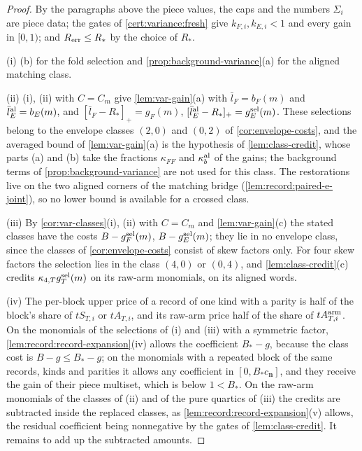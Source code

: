 \begin{proof}
By the paragraphs above the piece values, the caps and the numbers $\Sigma_i$ are
piece data; the gates of \cref{cert:variance:fresh} give $k_{F,i},k_{E,i}<1$ and
every gain in $[0,1)$; and $R_{\rm err}\le R_*$ by the choice of $R_*$.

(i) (b) for the fold selection and
\cref{prop:background-variance}(a) for the aligned matching class.

(ii) (i), (ii) with $C=C_m$ give \cref{lem:var-gain}(a) with
$\bar l_F=b_F(m)$ and $\bar l^{\rm al}_E=b_E(m)$, and $[\bar l_F-R_*]_+=g_F(m)$,
$[\bar l^{\rm al}_E-R_*]_+=g^{\rm sel}_E(m)$. These selections belong to the
envelope classes $(2,0)$ and $(0,2)$ of \cref{cor:envelope-costs}, and the
averaged bound of \cref{lem:var-gain}(a) is the hypothesis of
\cref{lem:class-credit}, whose parts (a) and (b) take the fractions $\kappa_{FF}$
and $\kappa^{\rm al}_b$ of the gains; the background terms of
\cref{prop:background-variance} are not used for this class. The restorations
live on the two aligned corners of the matching bridge
(\cref{lem:record:paired-e-joint}), so no lower bound is available for a crossed
class.

(iii) By \cref{cor:var-classes}(i), (ii) with $C=C_m$ and \cref{lem:var-gain}(c)
the stated classes have the costs $B-g^{\rm sel}_F(m)$, $B-g^{\rm sel}_E(m)$;
they lie in no envelope class, since the classes of \cref{cor:envelope-costs}
consist of skew factors only. For four skew factors the selection lies in the
class $(4,0)$ or $(0,4)$, and \cref{lem:class-credit}(c) credits
$\kappa_{4,T}g^{\rm sel}_T(m)$ on its raw-arm monomials, on its aligned words.

(iv) The per-block upper price of a record of one kind with a parity is half of
the block's share of $tS_{T,i}$ or $tA_{T,i}$, and its raw-arm price half of the
share of $tA^{\rm arm}_{T,i}$. On the monomials of the selections of (i) and (iii)
with a symmetric factor, \cref{lem:record:record-expansion}(iv) allows the
coefficient $B_*-g$, because the class cost is $B-g\le B_*-g$; on the monomials
with a repeated block of the same records, kinds and parities it allows any
coefficient in $[0,B_*c_{\boldsymbol n}]$, and they receive the gain of their
piece multiset, which is below $1<B_*$. On the raw-arm monomials of the classes
of (ii) and of the pure quartics of (iii) the credits are subtracted inside the
replaced classes, as \cref{lem:record:record-expansion}(v) allows, the residual
coefficient being nonnegative by the gates of \cref{lem:class-credit}. It remains
to add up the subtracted amounts.


\end{proof}
